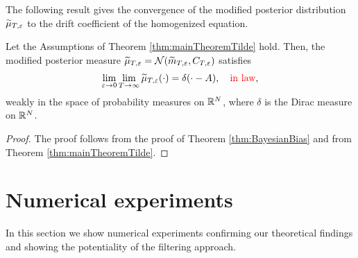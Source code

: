 \documentclass[10pt]{article}
\begin{document}
The following result gives the convergence of the modified posterior distribution $\widetilde \mu_{T, \varepsilon}$ to the drift coefficient of the homogenized equation.
\begin{theorem} Let the Assumptions of Theorem \ref{thm:mainTheoremTilde} hold. Then, the modified posterior measure $\widetilde\mu_{T,\varepsilon} = \mathcal N(\widetilde m_{T,\varepsilon}, C_{T,\varepsilon})$ satisfies
	\begin{equation}
	\lim_{\varepsilon \to 0}\lim_{T \to \infty} \widetilde \mu_{T,\varepsilon}(\cdot) = \delta(\cdot - A), \quad {\color{red}\text{in law}},
	\end{equation}
	weakly in the space of probability measures on $\mathbb{R}^N$, where $\delta$ is the Dirac measure on $\mathbb{R}^N$.
\end{theorem}
\begin{proof} The proof follows from the proof of Theorem \ref{thm:BayesianBias} and from Theorem \ref{thm:mainTheoremTilde}.
\end{proof}


\section{Numerical experiments}\label{sec:NumExp}

In this section we show numerical experiments confirming our theoretical findings and showing the potentiality of the filtering approach.
\end{document}
